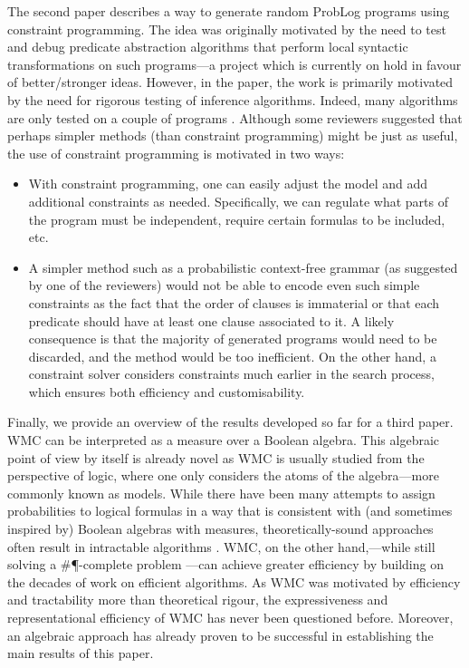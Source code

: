 \documentclass{article}
\begin{document}
The second paper describes a way to generate random ProbLog programs using
constraint programming. The idea was originally motivated by the need to test
and debug predicate abstraction algorithms that perform local syntactic
transformations on such programs---a project which is currently on hold in
favour of better/stronger ideas. However, in the paper, the work is primarily
motivated by the need for rigorous testing of inference algorithms. Indeed, many
algorithms are only tested on a couple of programs
\cite{DBLP:conf/ecai/BruynoogheMKGVJR10,DBLP:journals/tplp/KimmigDRCR11,DBLP:conf/ijcai/VlasselaerBKMR15}.
Although some reviewers suggested that perhaps simpler methods (than constraint
programming) might be just as useful, the use of constraint programming is
motivated in two ways:
\begin{itemize}
\item With constraint programming, one can easily adjust the model and add
  additional constraints as needed. Specifically, we can regulate what parts of
  the program must be independent, require certain formulas to be included, etc.
\item A simpler method such as a probabilistic context-free grammar (as
  suggested by one of the reviewers) would not be able to encode even such
  simple constraints as the fact that the order of clauses is immaterial or that
  each predicate should have at least one clause associated to it. A likely
  consequence is that the majority of generated programs would need to be
  discarded, and the method would be too inefficient. On the other hand, a
  constraint solver considers constraints much earlier in the search process,
  which ensures both efficiency and customisability.
\end{itemize}

Finally, we provide an overview of the results developed so far for a third
paper. WMC can be interpreted as a measure over a Boolean algebra. This
algebraic point of view by itself is already novel as WMC is usually studied
from the perspective of logic, where one only considers the atoms of the
algebra---more commonly known as models. While there have been many attempts to
assign probabilities to logical formulas in a way that is consistent with (and
sometimes inspired by) Boolean algebras with measures, theoretically-sound
approaches often result in intractable algorithms
\cite{DBLP:journals/soco/CastineiraCT02,DBLP:journals/eccc/GarrabrantBCST16,DBLP:journals/ndjfl/Hailperin84,krauss1968representation,DBLP:journals/ai/Nilsson86}.
WMC, on the other hand,---while still solving a \#\P{}-complete problem
\cite{DBLP:conf/aaai/SangBK05}---can achieve greater efficiency by building on
the decades of work on efficient \SAT{} algorithms. As WMC was motivated by
efficiency and tractability more than theoretical rigour, the expressiveness and
representational efficiency of WMC has never been questioned before. Moreover,
an algebraic approach has already proven to be successful in establishing the
main results of this paper.
\end{document}
